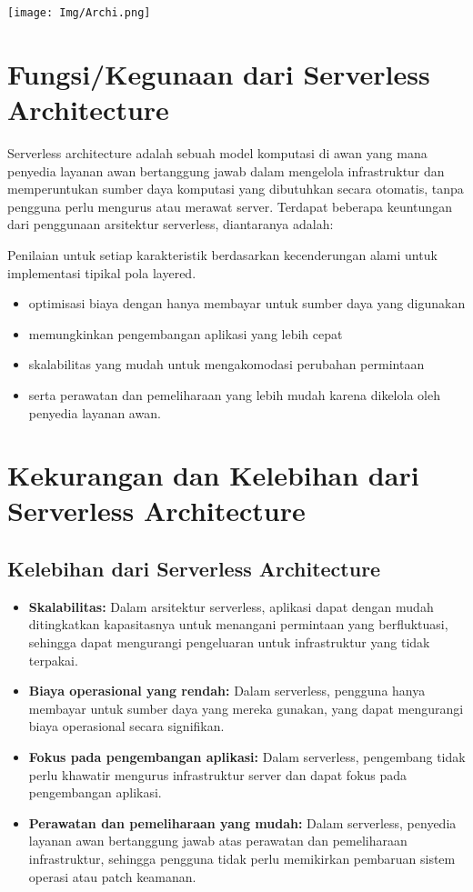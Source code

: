 \documentclass[a4paper,12pt]{article}
\begin{document}
\texttt{[image: Img/Archi.png]}

\section*{Fungsi/Kegunaan dari Serverless Architecture}

Serverless architecture adalah sebuah model komputasi di awan yang mana penyedia layanan awan bertanggung jawab dalam mengelola infrastruktur dan memperuntukan sumber daya komputasi yang dibutuhkan secara otomatis, tanpa pengguna perlu mengurus atau merawat server. Terdapat beberapa keuntungan dari penggunaan arsitektur serverless, diantaranya adalah:

Penilaian untuk setiap karakteristik berdasarkan kecenderungan alami untuk implementasi tipikal pola layered.

\begin{itemize}
	\item optimisasi biaya dengan hanya membayar untuk sumber daya yang digunakan
	\item memungkinkan pengembangan aplikasi yang lebih cepat
	\item skalabilitas yang mudah untuk mengakomodasi perubahan permintaan
	\item serta perawatan dan pemeliharaan yang lebih mudah karena dikelola oleh penyedia layanan awan.
\end{itemize}

\section*{Kekurangan dan Kelebihan dari Serverless Architecture}
\subsection*{Kelebihan dari Serverless Architecture}

\begin{itemize}
	\item \textbf{Skalabilitas:} Dalam arsitektur serverless, aplikasi dapat dengan mudah ditingkatkan kapasitasnya untuk menangani permintaan yang berfluktuasi, sehingga dapat mengurangi pengeluaran untuk infrastruktur yang tidak terpakai.
	\item \textbf{Biaya operasional yang rendah:} Dalam serverless, pengguna hanya membayar untuk sumber daya yang mereka gunakan, yang dapat mengurangi biaya operasional secara signifikan.
	\item \textbf{Fokus pada pengembangan aplikasi:} Dalam serverless, pengembang tidak perlu khawatir mengurus infrastruktur server dan dapat fokus pada pengembangan aplikasi.
	\item \textbf{Perawatan dan pemeliharaan yang mudah:} Dalam serverless, penyedia layanan awan bertanggung jawab atas perawatan dan pemeliharaan infrastruktur, sehingga pengguna tidak perlu memikirkan pembaruan sistem operasi atau patch keamanan.
\end{itemize}
\end{document}
